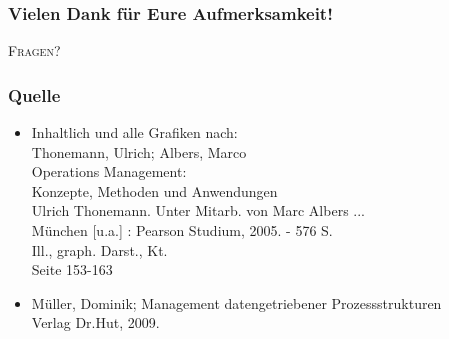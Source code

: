 \documentclass[xcolor=dvipsnames]{beamer}
\begin{document}
   \begin{frame}
  \frametitle{Vielen Dank für Eure Aufmerksamkeit!}
\begin{center}
  \begin{Huge}
\textsc{Fragen?}
\end{Huge}

\end{center}
  \end{frame}


 \begin{frame}
  \frametitle{Quelle}
   \begin{itemize}
    \item Inhaltlich und alle Grafiken nach:\\
      Thonemann, Ulrich; Albers, Marco\\
      Operations Management:\\
      Konzepte, Methoden und Anwendungen\\
      Ulrich Thonemann. Unter Mitarb. von Marc Albers ... \\
      München [u.a.] : Pearson Studium, 2005. - 576 S.\\
      Ill., graph. Darst., Kt.\\
      Seite 153-163
     \item Müller, Dominik; Management datengetriebener Prozessstrukturen\\
      Verlag Dr.Hut, 2009.
   \end{itemize}
 \end{frame}
\end{document}
